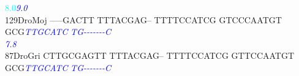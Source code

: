 \documentclass[11pt,twoside,reqno,a4paper]{article}
\begin{document}
{\hspace*{4\charwidth}\hspace*{7\charwidth}\hspace*{0\charwidth}\textcolor{cyan}{8.0}\hspace*{1\charwidth}\hspace*{1\charwidth}\hspace*{1\charwidth}\hspace*{1\charwidth}\hspace*{40\charwidth}\textit{\textcolor{blue}{9.0}}\hspace*{1\charwidth}\hspace*{1\charwidth}\\
129\hspace*{1\charwidth}DroMoj	-----GACTT	TTTACGAG--	TTTTCCATCG	GTCCCAATGT	GCG\textit{\textcolor{blue}{T}}\textit{\textcolor{blue}{T}}\textit{\textcolor{blue}{G}}\textit{\textcolor{blue}{C}}\textit{\textcolor{blue}{A}}\textit{\textcolor{blue}{T}}\textit{\textcolor{blue}{C}}	\textit{\textcolor{blue}{T}}\textit{\textcolor{blue}{G}}\textit{\textcolor{blue}{-}}\textit{\textcolor{blue}{-}}\textit{\textcolor{blue}{-}}\textit{\textcolor{blue}{-}}\textit{\textcolor{blue}{-}}\textit{\textcolor{blue}{-}}\textit{\textcolor{blue}{-}}\textit{\textcolor{blue}{C}}	\\
\hspace*{4\charwidth}\hspace*{7\charwidth}\hspace*{1\charwidth}\hspace*{1\charwidth}\hspace*{1\charwidth}\hspace*{1\charwidth}\hspace*{43\charwidth}\textit{\textcolor{blue}{7.8}}\hspace*{1\charwidth}\hspace*{1\charwidth}\\
87\hspace*{2\charwidth}DroGri	CTTGCGAGTT	TTTACGAG--	TTTTCCATCG	GTTCCAATGT	GCG\textit{\textcolor{blue}{T}}\textit{\textcolor{blue}{T}}\textit{\textcolor{blue}{G}}\textit{\textcolor{blue}{C}}\textit{\textcolor{blue}{A}}\textit{\textcolor{blue}{T}}\textit{\textcolor{blue}{C}}	\textit{\textcolor{blue}{T}}\textit{\textcolor{blue}{G}}\textit{\textcolor{blue}{-}}\textit{\textcolor{blue}{-}}\textit{\textcolor{blue}{-}}\textit{\textcolor{blue}{-}}\textit{\textcolor{blue}{-}}\textit{\textcolor{blue}{-}}\textit{\textcolor{blue}{-}}\textit{\textcolor{blue}{C}}	\\
}
\end{document}
